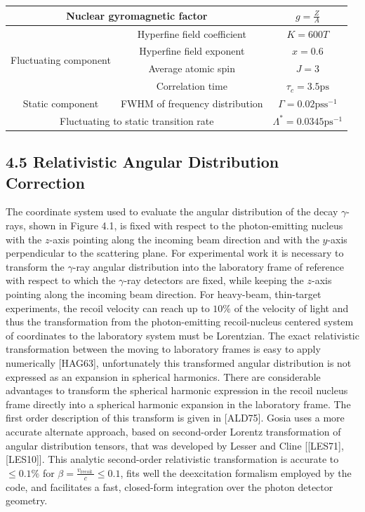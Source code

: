 \documentclass[10pt]{article}
\begin{document}
\begin{center}
\begin{tabular}{|c|c|c|}
\hline
\multicolumn{2}{|c|}{Nuclear gyromagnetic factor} & $g=\frac{Z}{A}$ \\
\hline
\multirow{4}{*}{Fluctuating component} & Hyperfine field coefficient & $K=600 T$ \\
\cline { 2 - 3 }
 & Hyperfine field exponent & $x=0.6$ \\
\cline { 2 - 3 }
 & Average atomic spin & $J=3$ \\
\cline { 2 - 3 }
 & Correlation time & $\tau_{c}=3.5 \mathrm{ps}$ \\
\hline
Static component & FWHM of frequency distribution & $\Gamma=0.02 \mathrm{ps} \mathrm{s}^{-1}$ \\
\hline
\multicolumn{2}{|c|}{Fluctuating to static transition rate} & $\Lambda^{*}=0.0345 \mathrm{ps}^{-1}$ \\
\hline
\end{tabular}
\end{center}

\subsection*{4.5 Relativistic Angular Distribution Correction}
The coordinate system used to evaluate the angular distribution of the decay $\gamma$-rays, shown in Figure 4.1, is fixed with respect to the photon-emitting nucleus with the $z$-axis pointing along the incoming beam direction and with the $y$-axis perpendicular to the scattering plane. For experimental work it is necessary to transform the $\gamma$-ray angular distribution into the laboratory frame of reference with respect to which the $\gamma$-ray detectors are fixed, while keeping the $z$-axis pointing along the incoming beam direction. For heavy-beam, thin-target experiments, the recoil velocity can reach up to $10 \%$ of the velocity of light and thus the transformation from the photon-emitting recoil-nucleus centered system of coordinates to the laboratory system must be Lorentzian. The exact relativistic transformation between the moving to laboratory frames is easy to apply numerically [HAG63], unfortunately this transformed angular distribution is not expressed as an expansion in spherical harmonics. There are considerable advantages to transform the spherical harmonic expression in the recoil nucleus frame directly into a spherical harmonic expansion in the laboratory frame. The first order description of this transform is given in [ALD75]. Gosia uses a more accurate alternate approach, based on second-order Lorentz transformation of angular distribution tensors, that was developed by Lesser and Cline [[LES71],[LES10]]. This analytic second-order relativistic transformation is accurate to $\leq 0.1 \%$ for $\beta=\frac{v_{\text {recoil }}}{c} \leq 0.1$, fits well the deexcitation formalism employed by the code, and facilitates a fast, closed-form integration over the photon detector geometry.
\end{document}
